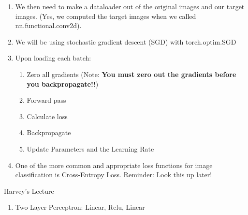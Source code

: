 \documentclass[a4paper, 11pt, oneside]{researchjournal} %
\begin{document}
\begin{enumerate}
    \item We then need to make a dataloader out of the original images and our target images. (Yes, we computed the target images when we called nn.functional.conv2d). 
    \item We will be using stochastic gradient descent (SGD) with torch.optim.SGD
    \item Upon loading each batch: 
    \begin{enumerate}
        \item Zero all gradients (Note: \textbf{You must zero out the gradients before you backpropagate!!})
        \item Forward pass
        \item Calculate loss 
        \item Backpropagate
        \item Update Parameters and the Learning Rate
    \end{enumerate}
    \item One of the more common and appropriate  loss functions for image classification is Cross-Entropy Loss. Reminder: Look this up later!
 \end{enumerate}

 Harvey's Lecture
 \begin{enumerate}
     \item Two-Layer Perceptron: Linear, Relu, Linear
 \end{enumerate}
\end{document}
